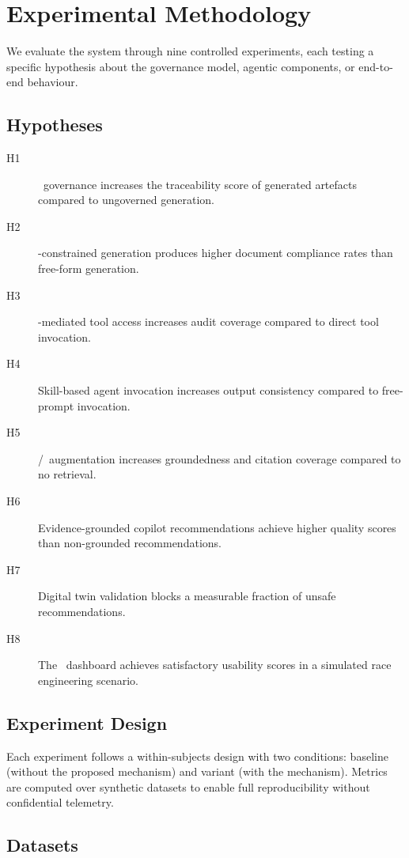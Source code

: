 \section{Experimental Methodology}
\label{sec:methodology}

We evaluate the system through nine controlled experiments, each testing a
specific hypothesis about the governance model, agentic components, or
end-to-end behaviour.

\subsection{Hypotheses}

\begin{description}
  \item[H1] \kdd~governance increases the traceability score of generated
    artefacts compared to ungoverned generation.
  \item[H2] \sdd-constrained generation produces higher document compliance
    rates than free-form generation.
  \item[H3] \mcp-mediated tool access increases audit coverage compared to
    direct tool invocation.
  \item[H4] Skill-based agent invocation increases output consistency compared
    to free-prompt invocation.
  \item[H5] \rag/\cag~augmentation increases groundedness and citation
    coverage compared to no retrieval.
  \item[H6] Evidence-grounded copilot recommendations achieve higher quality
    scores than non-grounded recommendations.
  \item[H7] Digital twin validation blocks a measurable fraction of unsafe
    recommendations.
  \item[H8] The \rcc~dashboard achieves satisfactory usability scores in a
    simulated race engineering scenario.
\end{description}

\subsection{Experiment Design}

Each experiment follows a within-subjects design with two conditions: baseline
(without the proposed mechanism) and variant (with the mechanism). Metrics are
computed over synthetic datasets to enable full reproducibility without
confidential telemetry.

\subsection{Datasets}

